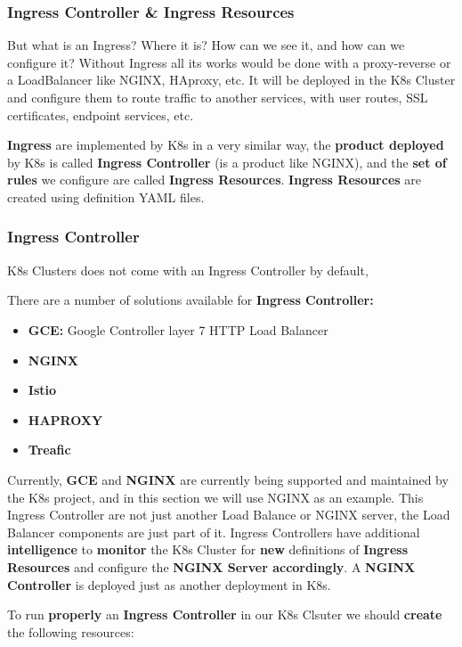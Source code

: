 \documentclass{article}
\begin{document}
\subsubsection{Ingress Controller \& Ingress Resources}

But what is an Ingress? Where it is? How can we see it, and how can we configure it? Without Ingress all its works would be done with a proxy-reverse or a LoadBalancer like NGINX, HAproxy, etc. It will be deployed in the K8s Cluster and configure them to route traffic to another services, with user routes, SSL certificates, endpoint services, etc.

\textbf{Ingress} are implemented by K8s in a very similar way, the \textbf{product deployed} by K8s is called \textbf{Ingress Controller} (is a product like NGINX), and the \textbf{set of rules} we configure are called \textbf{Ingress Resources}. \textbf{Ingress Resources} are created using definition YAML files. 

\subsubsection{Ingress Controller}

K8s Clusters does not come with an Ingress Controller by default, 

There are a number of solutions available for \textbf{Ingress Controller:}
\begin{itemize}
    \item \textbf{GCE:} Google Controller layer 7 HTTP Load Balancer
    \item \textbf{NGINX}
    \item \textbf{Istio}
    \item \textbf{HAPROXY}
    \item \textbf{Treafic}
\end{itemize}

Currently, \textbf{GCE} and \textbf{NGINX} are currently being supported and maintained by the K8s project, and in this section we will use NGINX as an example. This Ingress Controller are not just another Load Balance or NGINX server, the Load Balancer components are just part of it. Ingress Controllers have additional \textbf{intelligence} to \textbf{monitor} the K8s Cluster for \textbf{new} definitions of \textbf{Ingress Resources} and configure the \textbf{NGINX Server accordingly}. A \textbf{NGINX Controller} is deployed just as another deployment in K8s.

To run \textbf{properly} an \textbf{Ingress Controller} in our K8s Clsuter we should \textbf{create} the following resources:
\end{document}
